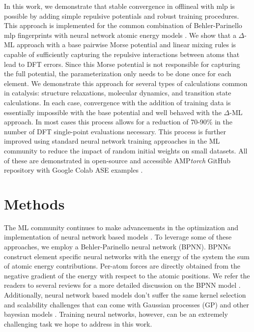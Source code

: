 \documentclass[
 reprint,
 amsmath,
 amssymb,
 aps,
]{revtex4-1}
\begin{document}
In this work, we demonstrate that stable convergence in \gls{offlineal} with \gls{mlp} is possible by adding simple repulsive potentials and robust training procedures. This approach is implemented for the common combination of Behler-Parinello \gls{mlp} fingerprints with neural network atomic energy models \cite{Behler2007}. We show that a $\Delta$-ML approach with a base pairwise Morse potential and linear mixing rules is capable of sufficiently capturing the repulsive interactions between atoms that lead to \gls{DFT} errors. Since this Morse potential is not responsible for capturing the full potential, the parameterization only needs to be done once for each element. We demonstrate this approach for several types of calculations common in catalysis: structure relaxations, molecular dynamics, and transition state calculations. In each case, convergence with the addition of training data is essentially impossible with the base potential and well behaved with the $\Delta$-ML approach. In most cases this process allows for a reduction of 70-90\% in the number of DFT single-point evaluations necessary.  This process is further improved using standard neural network training approaches in the ML community to reduce the impact of random initial weights on small datasets. All of these are demonstrated in open-source and accessible AMP\textit{torch} GitHub repository with Google Colab ASE examples \cite{amptorch, examples}. 

\section{Methods}
The ML community continues to make advancements in the optimization and implementation of neural network based models \cite{Loshchilov2019, Fey2019, Paszke2019}. To leverage some of these approaches, we employ a Behler-Parinello neural network (BPNN). BPNNs construct element specific neural networks with the energy of the system the sum of atomic energy contributions. Per-atom forces are directly obtained from the negative gradient of the energy with respect to the atomic positions. We refer the readers to several reviews for a more detailed discussion on the BPNN model \cite{Behler2007, Behler2016, Khorshidi2016}. Additionally, neural network based models don't suffer the same kernel selection and scalability challenges that can come with Gaussian processes (GP) and other bayesian models \cite{Bartok2015}. Training neural networks, however, can be an extremely challenging task we hope to address in this work.
\end{document}
